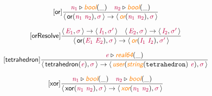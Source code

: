 \documentclass[10pt,leqno,fleqn]{article}
\newcommand{\artVariable}[1]{\mbox{\color{purple}\em #1\/}}
\newcommand{\artConstructor}[1]{\mbox{\sf #1}}
\newcommand{\artCaseInsensitiveLiteral}[1]{\mbox{\tt #1}}
\newcommand{\artSpecial}[1]{\mbox{\color{orange}\sf\em #1}}
\begin{document}
\begin{equation}
\tag*{[\artConstructor{\sf or}]}
\begin{split}\frac{ \artVariable{n$_{1}$}\triangleright \artSpecial{bool}(\_) \quad  \artVariable{n$_{2}$}\triangleright \artSpecial{bool}(\_) }{\langle\, \artConstructor{\sf or}(\artVariable{n$_{1}$}\ \artVariable{n$_{2}$}), \artVariable{$\sigma$}\,\rangle \rightarrow \langle\, \artSpecial{or}(\artVariable{n$_{1}$}\ \artVariable{n$_{2}$}), \artVariable{$\sigma$}\,\rangle }
\end{split}
\end{equation}

\begin{equation}
\tag*{[\artConstructor{\sf orResolve}]}
\begin{split}\frac{\langle\, \artVariable{E$_{1}$}, \artVariable{$\sigma$}\,\rangle \rightarrow \langle\, \artVariable{I$_{1}$}, \artVariable{$\sigma$\/$^\prime$}\,\rangle \quad \langle\, \artVariable{E$_{2}$}, \artVariable{$\sigma$}\,\rangle \rightarrow \langle\, \artVariable{I$_{2}$}, \artVariable{$\sigma$\/$^\prime$}\,\rangle }{\langle\, \artConstructor{\sf or}(\artVariable{E$_{1}$}\ \artVariable{E$_{2}$}), \artVariable{$\sigma$}\,\rangle \rightarrow \langle\, \artSpecial{or}(\artVariable{I$_{1}$}\ \artVariable{I$_{2}$}), \artVariable{$\sigma$\/$^\prime$}\,\rangle }
\end{split}
\end{equation}

\begin{equation}
\tag*{[\artConstructor{\sf tetrahedron}]}
\begin{split}\frac{ \artVariable{e}\triangleright \artSpecial{real64}(\_) }{\langle\, \artConstructor{\sf tetrahedron}(\artVariable{e}), \artVariable{$\sigma$}\,\rangle \rightarrow \langle\, \artSpecial{user}(\artSpecial{string}(\artCaseInsensitiveLiteral{tetrahedron})\ \artVariable{e}), \artVariable{$\sigma$}\,\rangle }
\end{split}
\end{equation}

\begin{equation}
\tag*{[\artConstructor{\sf xor}]}
\begin{split}\frac{ \artVariable{n$_{1}$}\triangleright \artSpecial{bool}(\_) \quad  \artVariable{n$_{2}$}\triangleright \artSpecial{bool}(\_) }{\langle\, \artConstructor{\sf xor}(\artVariable{n$_{1}$}\ \artVariable{n$_{2}$}), \artVariable{$\sigma$}\,\rangle \rightarrow \langle\, \artSpecial{xor}(\artVariable{n$_{1}$}\ \artVariable{n$_{2}$}), \artVariable{$\sigma$}\,\rangle }
\end{split}
\end{equation}
\end{document}
